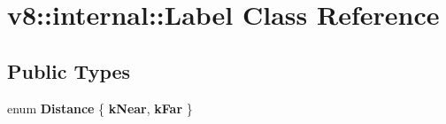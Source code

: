 \hypertarget{classv8_1_1internal_1_1Label}{}\section{v8\+:\+:internal\+:\+:Label Class Reference}
\label{classv8_1_1internal_1_1Label}
\subsection*{Public Types}
\begin{DoxyCompactItemize}
\item 
\mbox{\label{classv8_1_1internal_1_1Label_aaf4d372e0d5c91bed4a6cfa0dbb10a5e}} 
enum {\bfseries Distance} \{ {\bfseries k\+Near}, 
{\bfseries k\+Far}
 \}
\end{DoxyCompactItemize}

